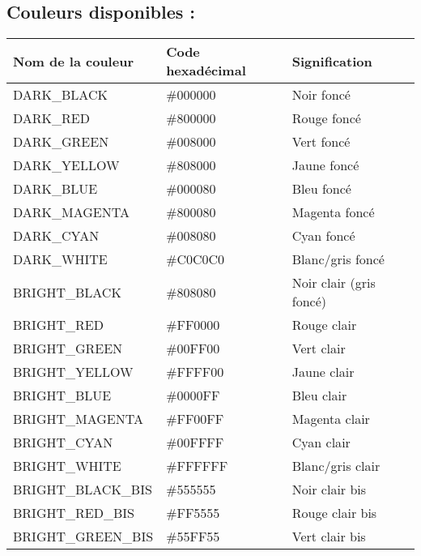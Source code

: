 \documentclass{article}
\begin{document}
\newpage
\subsection{Couleurs disponibles :}
\begin{table}[h!]
    \centering
    \renewcommand{\arraystretch}{1.5}
    \footnotesize
    \begin{tabular}{|>{\centering\arraybackslash}m{4cm}|>{\centering\arraybackslash}m{3cm}|>{\centering\arraybackslash}m{3cm}|}
        \hline
        \textbf{Nom de la couleur} & \textbf{Code hexadécimal} & \textbf{Signification} \\
        \hline
        DARK\_BLACK & \#000000 & Noir foncé \\
        \hline
        DARK\_RED & \#800000 & Rouge foncé \\
        \hline
        DARK\_GREEN & \#008000 & Vert foncé \\
        \hline
        DARK\_YELLOW & \#808000 & Jaune foncé \\
        \hline
        DARK\_BLUE & \#000080 & Bleu foncé \\
        \hline
        DARK\_MAGENTA & \#800080 & Magenta foncé \\
        \hline
        DARK\_CYAN & \#008080 & Cyan foncé \\
        \hline
        DARK\_WHITE & \#C0C0C0 & Blanc/gris foncé \\
        \hline
        BRIGHT\_BLACK & \#808080 & Noir clair (gris foncé) \\
        \hline
        BRIGHT\_RED & \#FF0000 & Rouge clair \\
        \hline
        BRIGHT\_GREEN & \#00FF00 & Vert clair \\
        \hline
        BRIGHT\_YELLOW & \#FFFF00 & Jaune clair \\
        \hline
        BRIGHT\_BLUE & \#0000FF & Bleu clair \\
        \hline
        BRIGHT\_MAGENTA & \#FF00FF & Magenta clair \\
        \hline
        BRIGHT\_CYAN & \#00FFFF & Cyan clair \\
        \hline
        BRIGHT\_WHITE & \#FFFFFF & Blanc/gris clair \\
        \hline
        BRIGHT\_BLACK\_BIS & \#555555 & Noir clair bis \\
        \hline
        BRIGHT\_RED\_BIS & \#FF5555 & Rouge clair bis \\
        \hline
        BRIGHT\_GREEN\_BIS & \#55FF55 & Vert clair bis \\

\end{tabular}
\end{table}
\end{document}
